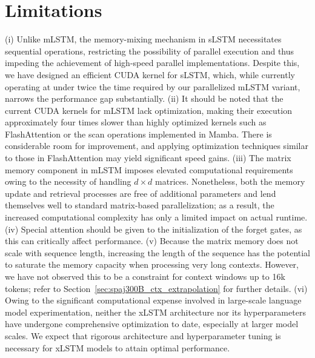 \section{Limitations}

(i) Unlike mLSTM, the memory-mixing mechanism in sLSTM necessitates sequential operations, restricting the possibility of parallel execution and thus impeding the achievement of high-speed parallel implementations. Despite this, we have designed an efficient CUDA kernel for sLSTM, which, while currently operating at under twice the time required by our parallelized mLSTM variant, narrows the performance gap substantially. (ii) It should be noted that the current CUDA kernels for mLSTM lack optimization, making their execution approximately four times slower than highly optimized kernels such as FlashAttention or the scan operations implemented in Mamba. There is considerable room for improvement, and applying optimization techniques similar to those in FlashAttention may yield significant speed gains. (iii) The matrix memory component in mLSTM imposes elevated computational requirements owing to the necessity of handling $d \times d$ matrices. Nonetheless, both the memory update and retrieval processes are free of additional parameters and lend themselves well to standard matrix-based parallelization; as a result, the increased computational complexity has only a limited impact on actual runtime. (iv) Special attention should be given to the initialization of the forget gates, as this can critically affect performance. (v) Because the matrix memory does not scale with sequence length, increasing the length of the sequence has the potential to saturate the memory capacity when processing very long contexts. However, we have not observed this to be a constraint for context windows up to 16k tokens; refer to Section~\ref{sec:spaj300B_ctx_extrapolation} for further details. (vi) Owing to the significant computational expense involved in large-scale language model experimentation, neither the xLSTM architecture nor its hyperparameters have undergone comprehensive optimization to date, especially at larger model scales. We expect that rigorous architecture and hyperparameter tuning is necessary for xLSTM models to attain optimal performance.

